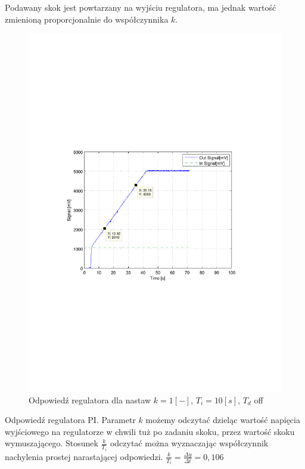 \documentclass[12pt]{article}
\begin{document}
Podawany skok jest powtarzany na wyjściu regulatora, ma jednak wartość zmienioną
proporcjonalnie do współczynnika $k$.

\newpage

\begin{figure}[!htb]
	\begin{center}
		\includegraphics[width=15cm,trim=3cm 9cm 3cm 9cm,clip]
		{../res/img/cont_1_10_0.pdf}
	\end{center}
	\caption{Odpowiedź regulatora dla nastaw $k=1[-]$, $T_i=10[s]$, $T_d$ off}
\end{figure}

Odpowiedź regulatora PI. Parametr $k$ możemy odczytać dzieląc wartość napięcia
wyjściowego na regulatorze w chwili tuż po zadaniu skoku, przez wartość skoku
wymuszającego. Stosunek $\frac{k}{T_i}$ odczytać można wyznaczając współczynnik
nachylenia prostej narastającej odpowiedzi. $\frac{k}{T_i}=\frac{\Delta
y}{\Delta t}=0,106$
\end{document}

